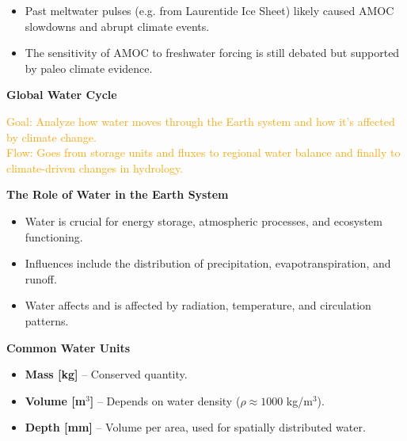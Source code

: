 \documentclass[fontsize=8pt, a4paper, landscape, fleqn]{scrartcl}
\renewcommand{\section}[1]{%
    \noindent\colorbox{sectioncolor}{%
        \parbox{\dimexpr\columnwidth-2\fboxsep}{\color{white}\textbf{#1}}}%
    \vspace{0.5mm}%
}
\renewcommand{\subsection}[1]{%
    \noindent\colorbox{subsectioncolor}{%
        \parbox{\dimexpr\columnwidth-2\fboxsep}{\color{white}\textbf{#1}}}%
    \vspace{0.5mm}%
}
\begin{document}
\begin{multicols*}{3}[\raggedcolumns]
\begin{itemize}
    \item Past meltwater pulses (e.g. from Laurentide Ice Sheet) likely caused AMOC slowdowns and abrupt climate events.
    \item The sensitivity of AMOC to freshwater forcing is still debated but supported by paleo climate evidence.
\end{itemize}

\section{Global Water Cycle}
\noindent\textcolor{orange}{
Goal: Analyze how water moves through the Earth system and how it's affected by climate change.\\
Flow: Goes from storage units and fluxes to regional water balance and finally to climate-driven changes in hydrology.
}
\subsection{The Role of Water in the Earth System}
\begin{itemize}
    \item Water is crucial for energy storage, atmospheric processes, and ecosystem functioning.
    \item Influences include the distribution of precipitation, evapotranspiration, and runoff.
    \item Water affects and is affected by radiation, temperature, and circulation patterns.
\end{itemize}

\subsection{Common Water Units}
\begin{itemize}
    \item \textbf{Mass [kg]} – Conserved quantity.
    \item \textbf{Volume [m$^3$]} – Depends on water density ($\rho \approx 1000$ kg/m$^3$).
    \item \textbf{Depth [mm]} – Volume per area, used for spatially distributed water.
\end{itemize}


\end{multicols*}
\end{document}
